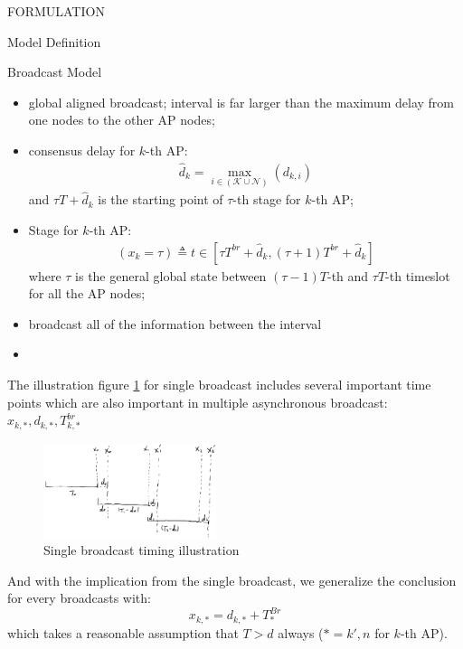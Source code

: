 \documentclass[10pt, conference, letterpaper]{IEEEtran}
\begin{document}
\begin{section}{FORMULATION}
\begin{subsection}{Model Definition}
\begin{subsubsection}{Broadcast Model}
                \begin{itemize}
                    \item global aligned broadcast; interval is far larger than the maximum delay from one nodes to the other AP nodes;
                    \item consensus delay for $k$-th AP:
                        \begin{align}
                            \hat{d}_k = \max_{i\in(\mathcal{K}\cup\mathcal{N})}(d_{k,i})
                        \end{align}
                        and $\tau T + \hat{d}_k$ is the starting point of $\tau$-th stage for $k$-th AP;
                    \item Stage for $k$-th AP:
                        \begin{align}
                            (x_k={\tau})\triangleq t \in [\tau T^{br}+\hat{d}_k, (\tau+1) T^{br}+\hat{d}_k]
                        \end{align}
                        where $\tau$ is the general global state between $(\tau-1) T$-th and $\tau T$-th timeslot for all the AP nodes;
                    \item broadcast all of the information between the interval
                    \item 
                \end{itemize}

                The illustration figure \ref{fig:brd} for single broadcast includes several important time points which are also important in multiple asynchronous broadcast: $x_{k,*}, d_{k,*}, T^{br}_{k,*}$
                \begin{figure}[h]
                    \centering
                    \includegraphics[width=0.45\textwidth]{single-broadcast.png}
                    \caption{Single broadcast timing illustration}
                    \label{fig:brd}
                \end{figure}
                And with the implication from the single broadcast, we generalize the conclusion for every broadcasts with:
                $$
                x_{k,*} = d_{k,*} + T^{Br}_{*}
                $$
                which takes a reasonable assumption that $T>d$ always ($*=k',n$ for $k$-th AP).


\end{subsubsection}
\end{subsection}
\end{section}
\end{document}
